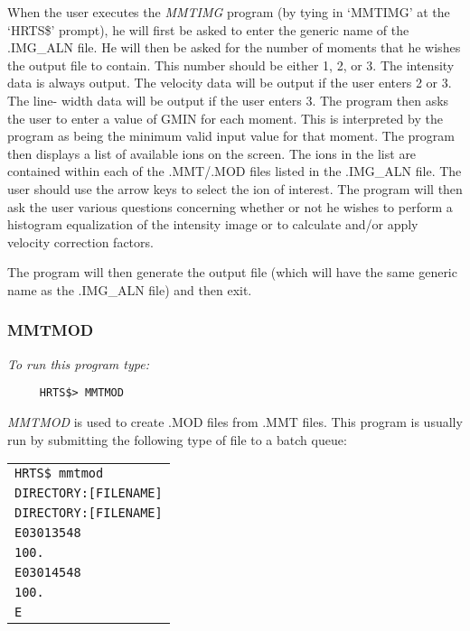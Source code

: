       When the user executes the {\em MMTIMG} program (by tying in `MMTIMG' at
   the `HRTS\$' prompt), he will first be asked to enter the generic name of
   the .IMG\_ALN file.  He will then be asked for the number of moments
   that he wishes the output file to contain.  This number should be
   either 1, 2, or 3.  The intensity data is always output.  The
   velocity data will be output if the user enters 2 or 3.  The line-
   width data will be output if the user enters 3.
      The program then asks the user to enter a value of GMIN for each
   moment.  This is interpreted by the program as being the minimum valid
   input value for that moment.
      The program then displays a list of available ions on the screen.
   The ions in the list are contained within each of the .MMT/.MOD files
   listed in the .IMG\_ALN file.  The user should use the arrow keys to
   select the ion of interest.
      The program will then ask the user various questions concerning
   whether or not he wishes to perform a histogram equalization of the
   intensity image or to calculate and/or apply velocity correction
   factors.

      The program will then generate the output file (which will have the
   same generic name as the .IMG\_ALN file) and then exit.

\subsubsection{MMTMOD}

{\em To run this program type:}
\begin{verbatim}   
     HRTS$> MMTMOD          
\end{verbatim}
{\em MMTMOD} is used to create .MOD files from .MMT files.  This program
   is usually run by submitting the following type of file to a batch queue:
\begin{center}   
\begin{tabular}{||l||}
\hline
                 
                      {\tt HRTS\$ mmtmod}  \\                  
                      {\tt DIRECTORY:[FILENAME]} \\    
                      {\tt DIRECTORY:[FILENAME]} \\    
                      {\tt E03013548}  \\                 
                      {\tt 100.}    \\                    
                      {\tt E03014548} \\                   
                      {\tt 100.} \\                       
                      {\tt E}  \\                         
\hline
\end{tabular}
\end{center}
   
